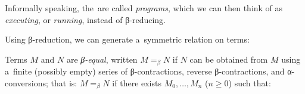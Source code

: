 Informally speaking, the~\lts are called \emph{programs}, which we can then
think of as \emph{executing}, or \emph{running}, instead of β-reducing.

Using β-reduction, we can generate a~symmetric relation on terms:
\begin{definition}
  Terms $M$ and $N$ are \emph{β-equal}, written $M =_\beta N$ if $N$ can be
  obtained from $M$ using a~finite (possibly empty) series of β-contractions,
  reverse β-contractions, and α-conversions; that is: $M =_\beta N$ if there
  exists $M_0, \dots, M_n$ ($n \geq 0$) such that:
\end{definition}


